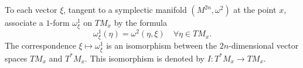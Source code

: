 To each vector $\xi$, tangent to a symplectic manifold $(M^{2n}, \omega^2)$ at the point $x$, associate a $1$-form $\omega^1_\xi$ on $TM_x$ by the formula
$$
\omega^1_\xi(\eta) = \omega^2(\eta, \xi) \quad \forall \eta \in TM_x.
$$
The correspondence $\xi \mapsto \omega^1_\xi$ is an isomorphism between the $2n$-dimensional vector spaces $TM_x$ and $T^*M_x$. This isomorphism is denoted by $I: T^*M_x \to TM_x$.

